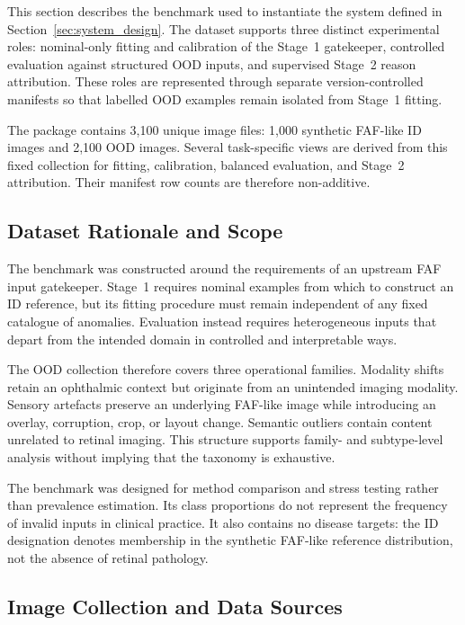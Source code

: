 \documentclass[fleqn,12pt]{olplainarticle}
\begin{document}
This section describes the benchmark used to instantiate the system defined in
Section~\ref{sec:system_design}. The dataset supports three distinct
experimental roles: nominal-only fitting and calibration of the Stage~1
gatekeeper, controlled evaluation against structured OOD inputs, and
supervised Stage~2 reason attribution. These roles are represented through
separate version-controlled manifests so that labelled OOD examples remain
isolated from Stage~1 fitting.

The package contains 3,100 unique image files: 1,000 synthetic FAF-like ID
images and 2,100 OOD images. Several task-specific views are derived from this
fixed collection for fitting, calibration, balanced evaluation, and Stage~2
attribution. Their manifest row counts are therefore non-additive.

\subsection{Dataset Rationale and Scope}
\label{subsec:dataset_rationale}

The benchmark was constructed around the requirements of an upstream FAF
input gatekeeper. Stage~1 requires nominal examples from which to construct an
ID reference, but its fitting procedure must remain independent of any fixed
catalogue of anomalies. Evaluation instead requires heterogeneous inputs that
depart from the intended domain in controlled and interpretable ways.

The OOD collection therefore covers three operational families. Modality
shifts retain an ophthalmic context but originate from an unintended imaging
modality. Sensory artefacts preserve an underlying FAF-like image while
introducing an overlay, corruption, crop, or layout change. Semantic outliers
contain content unrelated to retinal imaging. This structure supports
family- and subtype-level analysis without implying that the taxonomy is
exhaustive.

The benchmark was designed for method comparison and stress testing rather
than prevalence estimation. Its class proportions do not represent the
frequency of invalid inputs in clinical practice. It also contains no disease
targets: the ID designation denotes membership in the synthetic FAF-like
reference distribution, not the absence of retinal pathology.

\subsection{Image Collection and Data Sources}
\label{subsec:dataset_sources}
\end{document}
